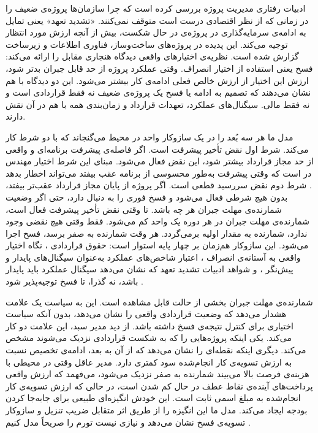ادبیات رفتاری مدیریت پروژه بررسی کرده است که چرا سازمان‌ها پروژه‌ی
ضعیف را در زمانی که از نظر اقتصادی درست است متوقف نمی‌کنند.
«تشدید تعهد» \citep{Staw1987} یعنی تمایل به ادامه‌ی سرمایه‌گذاری در
پروژه‌ی در حال شکست، بیش از آنچه ارزش مورد انتظار توجیه می‌کند. این
پدیده در پروژه‌های ساخت‌وساز، فناوری اطلاعات و زیرساخت گزارش شده
است.
نظریه‌ی اختیارهای واقعی \citep{Dixit1994, Huchzermeier2001} دیدگاه
هنجاری مقابل را ارائه می‌کند: فسخ یعنی استفاده از اختیار انصراف.
وقتی عملکرد پروژه از حد قابل جبران بدتر شود، ارزش این اختیار از
ارزش خالص فعلی ادامه‌ی کار بیشتر می‌شود.
این دو دیدگاه با هم نشان می‌دهند که تصمیم به ادامه یا فسخ یک پروژه‌ی
ضعیف نه فقط قراردادی است و نه فقط مالی. سیگنال‌های عملکرد، تعهدات
قرارداد و زمان‌بندی همه با هم در آن نقش دارند.

مدل ما هر سه بُعد را در یک سازوکار واحد در محیط می‌گنجاند که با دو
شرط کار می‌کند.
شرط اول نقض تأخیر پیشرفت است. اگر فاصله‌ی پیشرفت برنامه‌ای و واقعی
از حد مجاز قرارداد بیشتر شود، این نقض فعال می‌شود. مبنای این شرط
اختیار مهندس در  است که وقتی پیشرفت به‌طور محسوسی از
برنامه عقب بیفتد می‌تواند اخطار بدهد \citep{FIDIC2017}.
شرط دوم نقض سررسید قطعی است. اگر پروژه از پایان مجاز قرارداد
عقب‌تر بیفتد، بدون هیچ شرطی فعال می‌شود و فسخ فوری را به دنبال دارد،
حتی اگر وضعیت شمارنده‌ی مهلت جبران هر چه باشد.
تا وقتی نقض تأخیر پیشرفت فعال است، شمارنده‌ی مهلت جبران در هر دوره
یک واحد کم می‌شود. فقط وقتی هیچ نقضی وجود ندارد، شمارنده به مقدار
اولیه برمی‌گردد. هر وقت شمارنده به صفر برسد، فسخ اجرا می‌شود.
این سازوکار هم‌زمان بر چهار پایه استوار است: حقوق قراردادی
 \citep{FIDIC2017, Ndekugri2008}، نگاه اختیار واقعی به
آستانه‌ی انصراف \citep{Dixit1994, Huchzermeier2001}، اعتبار شاخص‌های
عملکرد  به‌عنوان سیگنال‌های پایدار و پیش‌نگر
\citep{christensen1993est, Lipke2003}، و شواهد ادبیات تشدید تعهد که
نشان می‌دهد سیگنال عملکرد باید پایدار باشد، نه گذرا، تا فسخ
توجیه‌پذیر شود \citep{Staw1987}.

شمارنده‌ی مهلت جبران بخشی از حالت قابل مشاهده است. این به سیاست یک
علامت هشدار می‌دهد که وضعیت قراردادی واقعی را نشان می‌دهد، بدون آنکه
سیاست اختیاری برای کنترل نتیجه‌ی فسخ داشته باشد.
از دید مدیر سبد، این علامت دو کار می‌کند. یکی اینکه پروژه‌هایی را که
به شکست قراردادی نزدیک می‌شوند مشخص می‌کند. دیگری اینکه نقطه‌ای را
نشان می‌دهد که از آن به بعد، ادامه‌ی تخصیص نسبت به ارزش تسویه‌ی کار
انجام‌شده سود کمتری دارد.
مدیر عاقل وقتی در محیطی با هزینه‌ی فرصت بالا می‌بیند شمارنده به صفر
نزدیک می‌شود، می‌فهمد که ارزش واقعی پرداخت‌های آینده‌ی نقاط عطف در
حال کم شدن است، در حالی که ارزش تسویه‌ی کار انجام‌شده به مبلغ اسمی
ثابت است. این خودش انگیزه‌ای طبیعی برای جابه‌جا کردن بودجه ایجاد
می‌کند. مدل ما این انگیزه را از طریق اثر متقابل ضریب تنزیل و
سازوکار تسویه‌ی فسخ نشان می‌دهد و نیازی نیست تورم را صریحاً مدل
کنیم \citep{Dixit1994, FIDIC2017}.

